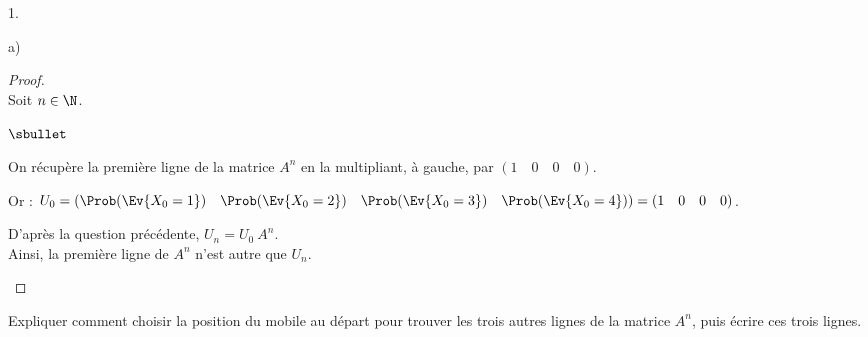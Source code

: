 \begin{noliste}{1.}
\begin{noliste}{a)}
    \begin{proof}~\\%
      Soit $n \in \N$.
      \begin{noliste}{$\sbullet$}
      \item On récupère la première ligne de la matrice $A^n$ en la
        multipliant, à gauche, par $(1 \quad 0 \quad 0 \quad 0)$.
      \item Or : $U_0 = (\Prob(\Ev{X_0 = 1}) \quad \Prob(\Ev{X_0 = 2})
        \quad \Prob(\Ev{X_0 = 3}) \quad \Prob(\Ev{X_0 = 4})) = (1
        \quad 0 \quad 0 \quad 0)$.
      \item D'après la question précédente, $U_n = U_0 \ A^n$.\\
        Ainsi, la première ligne de $A^n$ n'est autre que $U_n$.%
        ~\\[-1.2cm]
      \end{noliste}
    \end{proof}
  \end{noliste}
  
  
  \newpage
  
  
\item Expliquer comment choisir la position du mobile au départ pour
  trouver les trois autres lignes de la matrice $A^{n}$, puis écrire
  ces trois lignes.


\end{noliste}
